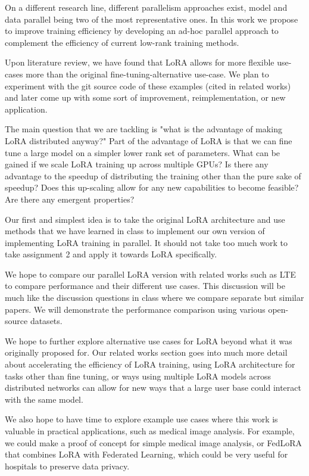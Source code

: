 \documentclass[pdftex,twocolumn,10pt,letterpaper]{article}
\begin{document}
On a different research line, different parallelism approaches exist, model and data parallel being two of the most representative ones. In this work we propose to improve training efficiency by developing an ad-hoc parallel approach to complement the efficiency of current low-rank training methods. 

Upon literature review, we have found that LoRA allows for more flexible use-cases more than the original fine-tuning-alternative use-case. We plan to experiment with the git source code of these examples (cited in related works) and later come up with some sort of improvement, reimplementation, or new application.

The main question that we are tackling is "what is the advantage of making LoRA distributed anyway?" Part of the advantage of LoRA is that we can fine tune a large model on a simpler lower rank set of parameters. What can be gained if we scale LoRA training up across multiple GPUs? Is there any advantage to the speedup of distributing the training other than the pure sake of speedup? Does this up-scaling allow for any new capabilities to become feasible? Are there any emergent properties?

Our first and simplest idea is to take the original LoRA architecture and use methods that we have learned in class to implement our own version of implementing LoRA training in parallel. It should not take too much work to take assignment 2 and apply it towards LoRA specifically.

We hope to compare our parallel LoRA version with related works such as LTE to compare performance and their different use cases. This discussion will be much like the discussion questions in class where we compare separate but similar papers. We will demonstrate the performance comparison using various open-source datasets.

We hope to further explore alternative use cases for LoRA beyond what it was originally proposed for. Our related works section goes into much more detail about accelerating the efficiency of LoRA training, using LoRA architecture for tasks other than fine tuning, or ways using multiple LoRA models across distributed networks can allow for new ways that a large user base could interact with the same model.

We also hope to have time to explore example use cases where this work is valuable in practical applications, such as medical image analysis. For example, we could make a proof of concept for simple medical image analysis, or FedLoRA that combines LoRA with Federated Learning, which could be very useful for hospitals to preserve data privacy.
 
\end{document}
